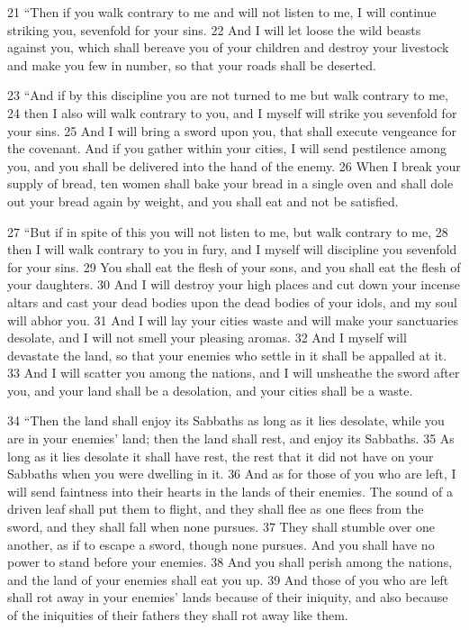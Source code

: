 \begin{bible}
21 ``Then if you walk contrary to me and will not listen to me, I will continue striking you, sevenfold for your sins. 22 And I will let loose the wild beasts against you, which shall bereave you of your children and destroy your livestock and make you few in number, so that your roads shall be deserted.

23 ``And if by this discipline you are not turned to me but walk contrary to me, 24 then I also will walk contrary to you, and I myself will strike you sevenfold for your sins. 25 And I will bring a sword upon you, that shall execute vengeance for the covenant. And if you gather within your cities, I will send pestilence among you, and you shall be delivered into the hand of the enemy. 26 When I break your supply of bread, ten women shall bake your bread in a single oven and shall dole out your bread again by weight, and you shall eat and not be satisfied.

27 ``But if in spite of this you will not listen to me, but walk contrary to me, 28 then I will walk contrary to you in fury, and I myself will discipline you sevenfold for your sins. 29 You shall eat the flesh of your sons, and you shall eat the flesh of your daughters. 30 And I will destroy your high places and cut down your incense altars and cast your dead bodies upon the dead bodies of your idols, and my soul will abhor you. 31 And I will lay your cities waste and will make your sanctuaries desolate, and I will not smell your pleasing aromas. 32 And I myself will devastate the land, so that your enemies who settle in it shall be appalled at it. 33 And I will scatter you among the nations, and I will unsheathe the sword after you, and your land shall be a desolation, and your cities shall be a waste.

34 ``Then the land shall enjoy its Sabbaths as long as it lies desolate, while you are in your enemies' land; then the land shall rest, and enjoy its Sabbaths. 35 As long as it lies desolate it shall have rest, the rest that it did not have on your Sabbaths when you were dwelling in it. 36 And as for those of you who are left, I will send faintness into their hearts in the lands of their enemies. The sound of a driven leaf shall put them to flight, and they shall flee as one flees from the sword, and they shall fall when none pursues. 37 They shall stumble over one another, as if to escape a sword, though none pursues. And you shall have no power to stand before your enemies. 38 And you shall perish among the nations, and the land of your enemies shall eat you up. 39 And those of you who are left shall rot away in your enemies' lands because of their iniquity, and also because of the iniquities of their fathers they shall rot away like them.


\end{bible}
